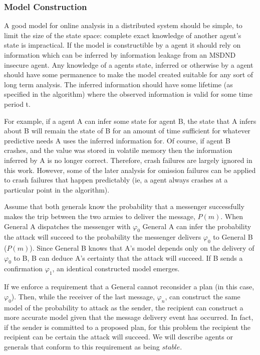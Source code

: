 \subsubsection{Model Construction}

A good model for online analysis in a distributed system should be simple, to limit the size of the state space: complete exact knowledge of another agent's state is impractical. If the model is constructible by a agent it should rely on information which can be inferred by information leakage from an MSDND insecure agent. Any knowledge of a agents state, inferred or otherwise by a agent should have some permanence to make the model created suitable for any sort of long term analysis. The inferred information should have some lifetime (as specified in the algorithm) where the observed information is valid for some time period t.

For example, if a agent A can infer some state for agent B, the state that A infers about B will remain the state of B for an amount of time sufficient for whatever predictive needs A uses the inferred information for. Of course, if agent B crashes, and the value was stored in volatile memory then the information inferred by A is no longer correct. Therefore, crash failures are largely ignored in this work. However, some of the later analysis for omission failures can be applied to crash failures that happen predictably (ie, a agent always crashes at a particular point in the algorithm).

Assume that both generals know the probability that a messenger successfully makes the trip between the two armies to deliver the message, $P(m)$. When General A dispatches the messenger with $\varphi_0$ General A can infer the probability the attack will succeed to the probability the messenger delivers $\varphi_0$ to General B ($P(m)$). Since General B knows that A's model depends only on the delivery of $\varphi_0$ to B, B can deduce A's certainty that the attack will succeed. If B sends a confirmation $\varphi_1$, an identical constructed model emerges.

If we enforce a requirement that a General cannot reconsider a plan (in this case, $\varphi_0$). Then, while the receiver of the last message, $\varphi_n$, can construct the same model of the probability to attack as the sender, the recipient can construct a more accurate model given that the message delivery event has occurred. In fact, if the sender is committed to a proposed plan, for this problem the recipient the recipient can be certain the attack will succeed. We will describe agents or generals that conform to this requirement as being $stable$.



